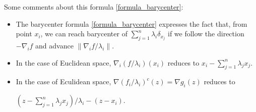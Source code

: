 

\begin{rmk}
	Some comments about this formula \cref{formula_barycenter}:
	\begin{itemize}
		\item The barycenter formula \cref{formula_barycenter} expresses the fact that,
		      from point $x_i$,
		      we can reach barycenter of $\sum_{j=1}^n \lambda_i \delta_{x_j}$ if we follow
		      the direction $-\nabla_i f$
		      and advance $\| \nabla_i f / \lambda_i \| $.
		\item In the case of Euclidean space, $\nabla_i (f/\lambda_i)(x_i)$ reduces to
		      $x_i - \sum_{j=1}^n \lambda_j x_j$.
		\item In the case of Eculidean space, $\nabla (f_i / \lambda_i)^c (z) = \nabla g_i(z) $ reduces to

		      $(z - \sum_{j=1}^n \lambda_j x_j) / \lambda_i -(z-x_i)$.
	\end{itemize}
\end{rmk}



